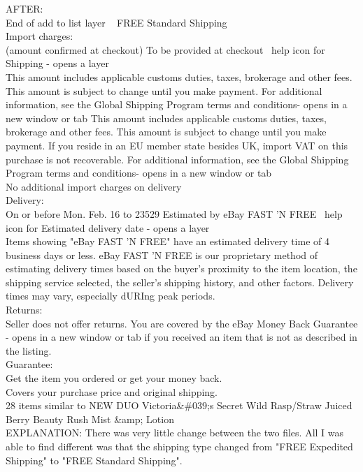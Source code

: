 \documentclass[12pt]{article}
\begin{document}
AFTER:\\
End of add to list layer
 
FREE Standard Shipping\\
Import charges:\\
(amount confirmed at checkout) To be provided at checkout  help icon for Shipping - opens a layer\\
This amount includes applicable customs duties, taxes, brokerage and other fees. This amount is subject to change until you make payment. For additional information, see the Global Shipping Program terms and conditions- opens in a new window or tab This amount includes applicable customs duties, taxes, brokerage and other fees. This amount is subject to change until you make payment. If you reside in an EU member state besides UK, import VAT on this purchase is not recoverable. For additional information, see the Global Shipping Program terms and conditions- opens in a new window or tab\\
No additional import charges on delivery\\
Delivery:\\
On or before Mon. Feb. 16 to 23529 Estimated by eBay FAST 'N FREE  help icon for Estimated delivery date - opens a layer\\
Items showing "eBay FAST 'N FREE" have an estimated delivery time of 4 business days or less. eBay FAST 'N FREE is our proprietary method of estimating delivery times based on the buyer's proximity to the item location, the shipping service selected, the seller's shipping history, and other factors. Delivery times may vary, especially dURIng peak periods.\\
Returns:\\
Seller does not offer returns. You are covered by the eBay Money Back Guarantee - opens in a new window or tab if you received an item that is not as described in the listing.\\
Guarantee:\\
Get the item you ordered or get your money back.\\
Covers your purchase price and original shipping.\\
28 items similar to NEW DUO Victoria\&\#039;s Secret Wild Rasp/Straw Juiced Berry Beauty Rush Mist \&amp; Lotion\\

EXPLANATION: There was very little change between the two files. All I was able to find different was that the shipping type changed from "FREE Expedited Shipping" to "FREE Standard Shipping".
\end{document}
